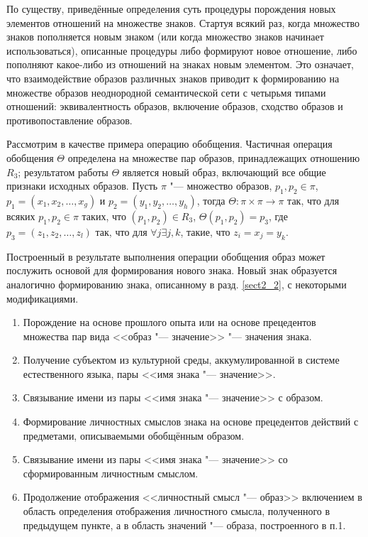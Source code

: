 По существу, приведённые определения суть процедуры порождения новых элементов отношений на множестве знаков. Стартуя всякий раз, когда множество знаков пополняется новым знаком (или когда множество знаков начинает использоваться), описанные процедуры либо формируют новое отношение, либо пополняют какое-либо из отношений на знаках новым элементом. Это означает, что взаимодействие образов различных знаков приводит к формированию на множестве образов неоднородной семантической сети \cite{Osipov1990} с четырьмя типами отношений: эквивалентность образов, включение образов, сходство образов и противопоставление образов.

Рассмотрим в качестве примера операцию обобщения. Частичная операция обобщения $\Theta$ определена на множестве пар образов, принадлежащих отношению $R_3$; результатом работы $\Theta$ является новый образ, включающий все общие признаки исходных образов. Пусть $\pi$ "--- множество образов, $p_1,p_2\in\pi$, $p_1=(x_1,x_2,\dots,x_g)$ и $p_2=(y_1,y_2,\dots,y_h)$, тогда $\Theta:\pi\times\pi\rightarrow\pi$ так, что для всяких $p_1,p_2\in\pi$ таких, что $(p_1,p_2)\in R_3$, $\Theta(p_1,p_2)=p_3$, где $p_3=(z_1,z_2,\dots,z_l)$ так, что для $\forall j\exists j,k$, такие, что $z_i=x_j=y_k$.

Построенный в результате выполнения операции обобщения образ может послужить основой для формирования нового знака. Новый знак образуется аналогично формированию знака, описанному в разд. \ref{sect2_2}, с некоторыми модификациями.
\begin{enumerate}
	\renewcommand\labelenumi{\theenumi.}
	\item Порождение на основе прошлого опыта или на основе прецедентов множества пар вида <<образ "--- значение>> "--- значения знака.
	\item Получение субъектом из культурной среды, аккумулированной в системе естественного языка, пары <<имя знака "--- значение>>.
	\item Связывание имени из пары <<имя знака "--- значение>> с образом.
	\item Формирование личностных смыслов знака на основе прецедентов действий с предметами, описываемыми обобщённым образом.
	\item Связывание имени из пары <<имя знака "--- значение>> со сформированным личностным смыслом.
	\item Продолжение отображения <<личностный смысл "--- образ>> включением в область определения отображения личностного смысла, полученного в предыдущем пункте, а в область значений "--- образа, построенного в п.1.
\end{enumerate}

